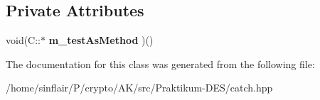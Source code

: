 \subsection*{Private Attributes}
\begin{DoxyCompactItemize}
\item 
\mbox{\label{classCatch_1_1TestInvokerAsMethod_a4851e50d6b43c022c41d5de776a27ed7}} 
void(C\+::$\ast$ {\bfseries m\+\_\+test\+As\+Method} )()
\end{DoxyCompactItemize}


The documentation for this class was generated from the following file\+:\begin{DoxyCompactItemize}
\item 
/home/sinflair/\+P/crypto/\+A\+K/src/\+Praktikum-\/\+D\+E\+S/catch.\+hpp\end{DoxyCompactItemize}
